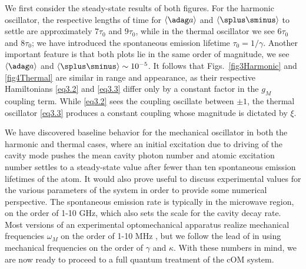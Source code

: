 We first consider the steady-state results of both figures. For the harmonic oscillator, the respective lengths of time for $\langle \adag a \rangle$ and $\langle \splus\sminus \rangle$ to settle are approximately $7\tau_0$ and $9\tau_0$, while in the thermal oscillator we see $6\tau_0$ and $8\tau_0$; we have introduced the spontaneous emission lifetime $\tau_0 = 1/\gamma$. Another important feature is that both plots lie in the same order of magnitude, we see $\langle \adag a \rangle$ and $\langle \splus\sminus \rangle \sim 10^{-5}$. It follows that Figs.~\ref{fig3Harmonic} and \ref{fig4Thermal} are similar in range and appearance, as their respective Hamiltonians \eqref{eq3.2} and \eqref{eq3.3} differ only by a constant factor in the $g_M$ coupling term. While \eqref{eq3.2} sees the coupling oscillate between $\pm 1$, the thermal oscillator \eqref{eq3.3} produces a constant coupling whose magnitude is dictated by $\xi$.

We have discovered baseline behavior for the mechanical oscillator in both the harmonic and thermal cases, where an initial excitation due to driving of the cavity mode pushes the mean cavity photon number and atomic excitation number settles to a steady-state value after fewer than ten spontaneous emission lifetimes of the atom. It would also prove useful to discuss experimental values for the various parameters of the system in order to provide some numerical perspective. The spontaneous emission rate is typically in the microwave region, on the order of 1-10 GHz, which also sets the scale for the cavity decay rate. Most versions of an experimental optomechanical apparatus realize mechanical frequencies $\omega_M$ on the order of 1-10 MHz \cite{arcizet2006, kippenberg2005, kimble2009}, but we follow the lead of \cite{thompson2007} in using mechanical frequencies on the order of $\gamma$ and $\kappa$. With these numbers in mind, we are now ready to proceed to a full quantum treatment of the cOM system.